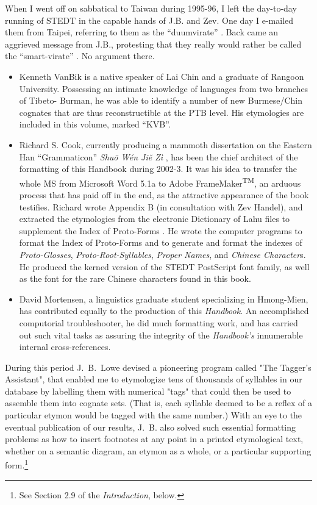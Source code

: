 When I went off on sabbatical to Taiwan during 1995-96, I left the day-to-day running of STEDT in the capable hands of J.B. and Zev. One day I e-mailed them from Taipei, referring to them as the ``duumvirate'' . Back came an aggrieved message from J.B., protesting that they really would rather be called the ``smart-virate'' . No argument there.

\begin{itemize}
\item Kenneth VanBik is a native speaker of Lai Chin and a graduate of Rangoon University. Possessing an intimate knowledge of languages from two branches of Tibeto- Burman, he was able to identify a number of new Burmese/Chin cognates that are thus reconstructible at the PTB level. His etymologies are included in this volume, marked ``KVB''.
\item Richard S. Cook, currently producing a mammoth dissertation on the Eastern Han ``Grammaticon''  {\it Shu\=o W\'en Ji\v{e} Z\`i} , has been the chief architect of the formatting of this Handbook  during 2002-3. It was his idea to transfer the whole MS from Microsoft Word 5.1a to Adobe FrameMaker\textsuperscript{TM}, an arduous process that has paid off in the end, as the attractive appearance of the book testifies. Richard wrote Appendix B  (in consultation with Zev Handel), and extracted the etymologies from the electronic  Dictionary of Lahu  files to supplement the Index of Proto-Forms . He wrote the computer programs to format the Index of Proto-Forms  and to generate and format the indexes of {\it Proto-Glosses}, {\it Proto-Root-Syllables}, {\it Proper Names}, and {\it Chinese Character}s. He produced the kerned version of the STEDT PostScript font family, as well as the font for the rare Chinese characters found in this book.
\item David Mortensen, a linguistics graduate student specializing in Hmong-Mien, has contributed equally to the production of this {\it Handbook}. An accomplished computorial troubleshooter, he did much formatting work, and has carried out such vital tasks as assuring the integrity of the {\it Handbook's} innumerable internal cross-references.
\end{itemize}

During this period J.~B.\ Lowe devised a pioneering program called "The Tagger's Assistant", that enabled me to etymologize tens of thousands of syllables in our database by labelling them with numerical "tags" that could then be used to assemble them into cognate sets.  (That is, each syllable deemed to be a reflex of a particular etymon would be tagged with the same number.)  With an eye to the eventual publication of our results, J.~B. also solved such essential formatting problems as how to insert footnotes at any point in a printed etymological text, whether on a semantic diagram, an etymon as a whole, or a particular supporting form.\footnote{See Section 2.9 of the \textit{Introduction}, below.}

